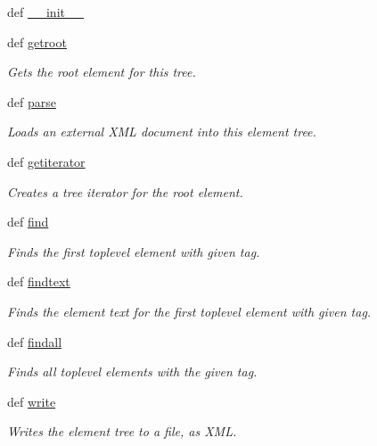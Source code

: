 \begin{DoxyCompactItemize}
\item 
def \hyperlink{classPyQt-x11-gpl-4_811_82_1_1elementtree_1_1ElementTree_1_1ElementTree_a9dd031ac8536ec6c0f8109b60ecb902f}{\+\_\+\+\_\+init\+\_\+\+\_\+}
\item 
def \hyperlink{classPyQt-x11-gpl-4_811_82_1_1elementtree_1_1ElementTree_1_1ElementTree_a527c4c360913adddebdba5cbca2e8157}{getroot}
\begin{DoxyCompactList}\small\item\em Gets the root element for this tree. \end{DoxyCompactList}\item 
def \hyperlink{classPyQt-x11-gpl-4_811_82_1_1elementtree_1_1ElementTree_1_1ElementTree_aa147eaccfa773db6fce94ec93e2f9d0b}{parse}
\begin{DoxyCompactList}\small\item\em Loads an external X\+M\+L document into this element tree. \end{DoxyCompactList}\item 
def \hyperlink{classPyQt-x11-gpl-4_811_82_1_1elementtree_1_1ElementTree_1_1ElementTree_ad54e9f40cb72983365820211f01a972b}{getiterator}
\begin{DoxyCompactList}\small\item\em Creates a tree iterator for the root element. \end{DoxyCompactList}\item 
def \hyperlink{classPyQt-x11-gpl-4_811_82_1_1elementtree_1_1ElementTree_1_1ElementTree_a950ac20a4a62d523150e57b3bf021046}{find}
\begin{DoxyCompactList}\small\item\em Finds the first toplevel element with given tag. \end{DoxyCompactList}\item 
def \hyperlink{classPyQt-x11-gpl-4_811_82_1_1elementtree_1_1ElementTree_1_1ElementTree_a72eea6de3705e804ce00448f5746b321}{findtext}
\begin{DoxyCompactList}\small\item\em Finds the element text for the first toplevel element with given tag. \end{DoxyCompactList}\item 
def \hyperlink{classPyQt-x11-gpl-4_811_82_1_1elementtree_1_1ElementTree_1_1ElementTree_a0d763c615c090dbd0997daf6b590692a}{findall}
\begin{DoxyCompactList}\small\item\em Finds all toplevel elements with the given tag. \end{DoxyCompactList}\item 
def \hyperlink{classPyQt-x11-gpl-4_811_82_1_1elementtree_1_1ElementTree_1_1ElementTree_a8f381789987b2b365caf4b46585ac75b}{write}
\begin{DoxyCompactList}\small\item\em Writes the element tree to a file, as X\+M\+L. \end{DoxyCompactList}\end{DoxyCompactItemize}


